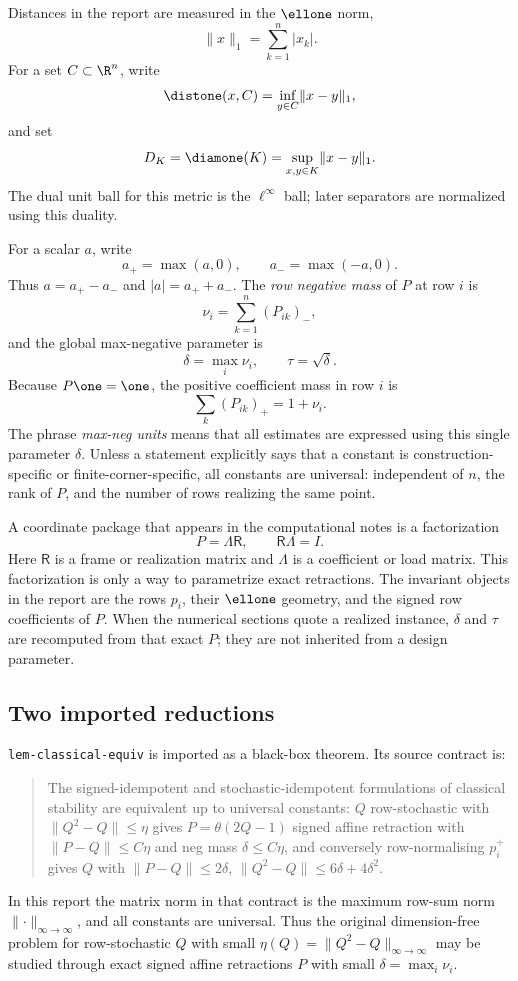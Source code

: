 Distances in the report are measured in the \(\ellone\) norm,
\[
  \lVert x\rVert_1=\sum_{k=1}^n |x_k|.
\]
For a set \(C\subset\R^n\), write
\[
  \distone(x,C)=\inf_{y\in C}\lVert x-y\rVert_1,
\]
and set
\[
  D_K=\diamone(K)=\sup_{x,y\in K}\lVert x-y\rVert_1.
\]
The dual unit ball for this metric is the \(\ell^\infty\) ball; later
separators are normalized using this duality.

For a scalar \(a\), write
\[
  a_+=\max(a,0),\qquad a_-=\max(-a,0).
\]
Thus \(a=a_+-a_-\) and \(|a|=a_++a_-\).  The \emph{row negative mass}
of \(P\) at row \(i\) is
\[
  \nu_i=\sum_{k=1}^n (P_{ik})_-,
\]
and the global max-negative parameter is
\[
  \delta=\max_i \nu_i,\qquad \tau=\sqrt{\delta}.
\]
Because \(P\one=\one\), the positive coefficient mass in row \(i\) is
\[
  \sum_k (P_{ik})_+=1+\nu_i.
\]
The phrase \emph{max-neg units} means that all estimates are expressed
using this single parameter \(\delta\).  Unless a statement explicitly
says that a constant is construction-specific or finite-corner-specific,
all constants are universal: independent of \(n\), the rank of \(P\),
and the number of rows realizing the same point.

A coordinate package that appears in the computational notes is a
factorization
\[
  P=\Lambda\mathsf R,\qquad \mathsf R\Lambda=I.
\]
Here \(\mathsf R\) is a frame or realization matrix and \(\Lambda\) is
a coefficient or load matrix.  This factorization is only a way to
parametrize exact retractions.  The invariant objects in the report are
the rows \(p_i\), their \(\ellone\) geometry, and the signed row
coefficients of \(P\).  When the numerical sections quote a realized
instance, \(\delta\) and \(\tau\) are recomputed from that exact \(P\);
they are not inherited from a design parameter.

\subsection{Two imported reductions}

\begin{proposition}
\provedbadge
\label{prop:classical-equiv-consumed}
\texttt{lem-classical-equiv} is imported as a black-box theorem.  Its
source contract is:
\begin{quote}\small
The signed-idempotent and stochastic-idempotent formulations of classical
stability are equivalent up to universal constants: \(Q\) row-stochastic
with \(\lVert Q^2-Q\rVert \leq \eta\) gives
\(P=\theta(2Q-1)\) signed affine retraction with
\(\lVert P-Q\rVert \leq C\eta\) and neg mass
\(\delta\leq C\eta\), and conversely row-normalising \(p_i^+\) gives
\(Q\) with \(\lVert P-Q\rVert \leq 2\delta\),
\(\lVert Q^2-Q\rVert \leq 6\delta+4\delta^2\).
\end{quote}
In this report the matrix norm in that contract is the maximum row-sum
norm \(\lVert\cdot\rVert_{\infty\to\infty}\), and all constants are
universal.  Thus the original dimension-free problem for row-stochastic
\(Q\) with small \(\eta(Q)=\lVert Q^2-Q\rVert_{\infty\to\infty}\) may be
studied through exact signed affine retractions \(P\) with small
\(\delta=\max_i\nu_i\).
\end{proposition}

